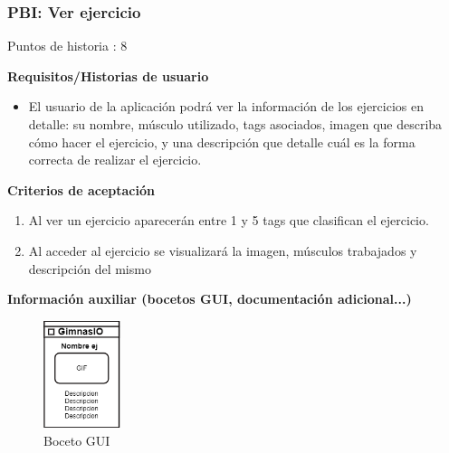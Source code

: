 \documentclass[11pt,a4paper]{report}
\begin{document}
\subsubsection{PBI: Ver ejercicio}
Puntos de historia : 8
\par\textbf{Requisitos/Historias de usuario}
\begin{itemize}
	\item El usuario de la aplicación podrá ver la información de los ejercicios en detalle: su nombre, músculo utilizado, tags asociados,  imagen que describa cómo hacer el ejercicio, y una descripción que detalle cuál es la forma correcta de realizar el ejercicio.
\end{itemize}
\par\textbf{Criterios de aceptación}
\begin{enumerate}
	\item Al ver un ejercicio aparecerán entre 1 y 5 tags que clasifican el ejercicio.
	\item Al acceder al ejercicio se visualizará la imagen, músculos trabajados y descripción del mismo
\end{enumerate}
\par\textbf{Información auxiliar (bocetos GUI, documentación adicional...)}
\begin{figure}[H]
	\centering
	\includegraphics[width=0.2\textwidth]{capturicas/guipbiverejer.png}
	\caption{Boceto GUI}
	\label{fig: guipbi3}
\end{figure}
\end{document}
